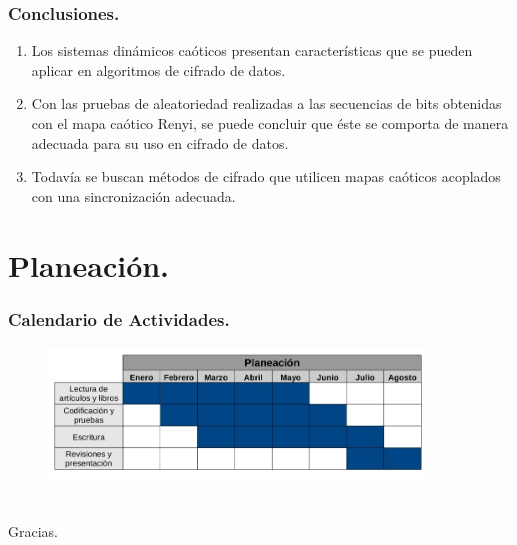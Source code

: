 \documentclass[xcolor=table]{beamer}
\begin{document}
\begin{frame}
\frametitle{Conclusiones.}
\begin{enumerate}
\item Los sistemas dinámicos caóticos presentan características que se pueden aplicar en algoritmos de cifrado de datos. 

\item Con las pruebas de aleatoriedad realizadas a las secuencias de bits obtenidas con el mapa caótico Renyi, se puede concluir que éste se comporta de manera adecuada para su uso en cifrado de datos.
 
\item Todavía se buscan métodos de cifrado que utilicen mapas caóticos acoplados con una sincronización adecuada.


\end{enumerate}
\end{frame}







\section{Planeación.}


\begin{frame}
\frametitle{Calendario de Actividades.}
\begin{figure}[H]
\centering
\includegraphics[width=10cm]{sss.jpg}
\end{figure}
\end{frame}






\section{ }
\begin{frame}
\begin{center}
Gracias.
\end{center}
\end{frame}
\end{document}
